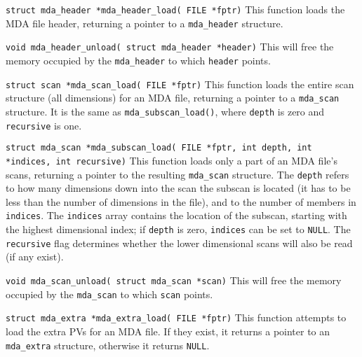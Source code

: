 \documentclass[10pt,letterpaper]{article}
\begin{document}
\vspace{1.5ex}
\noindent
\verb+struct mda_header *mda_header_load( FILE *fptr)+ \linebreak
This function loads the MDA file header, returning a pointer to a
\verb+mda_header+ structure.

\vspace{1.5ex}
\noindent
\verb+void mda_header_unload( struct mda_header *header)+ \linebreak
This will free the memory occupied by the \verb+mda_header+ to which
\verb+header+ points.

\vspace{1.5ex}
\noindent
\verb+struct scan *mda_scan_load( FILE *fptr)+ \linebreak
This function loads the entire scan structure (all dimensions) for an
MDA file, returning a pointer to a \verb+mda_scan+ structure.  It is
the same as \verb+mda_subscan_load()+, where \verb+depth+ is zero and
\verb+recursive+ is one.


\vspace{1.5ex}
\noindent
\verb+struct mda_scan *mda_subscan_load( FILE *fptr, int depth, int *indices, int recursive)+ \linebreak
This function loads only a part of an MDA file's scans, returning a
pointer to the resulting \verb+mda_scan+ structure.  The \verb+depth+
refers to how many dimensions down into the scan the subscan is
located (it has to be less than the number of dimensions in the file),
and to the number of members in \verb+indices+.  The \verb+indices+
array contains the location of the subscan, starting with the highest
dimensional index; if \verb+depth+ is zero, \verb+indices+ can be set
to \verb+NULL+.  The \verb+recursive+ flag determines whether the
lower dimensional scans will also be read (if any exist).

\vspace{1.5ex}
\noindent
\verb+void mda_scan_unload( struct mda_scan *scan)+ \linebreak
This will free the memory occupied by the \verb+mda_scan+ to which
\verb+scan+ points.

\vspace{1.5ex}
\noindent
\verb+struct mda_extra *mda_extra_load( FILE *fptr)+ \linebreak
This function attempts to load the extra PVs for an MDA file. If they
exist, it returns a pointer to an \verb+mda_extra+ structure,
otherwise it returns \verb+NULL+.
\end{document}
